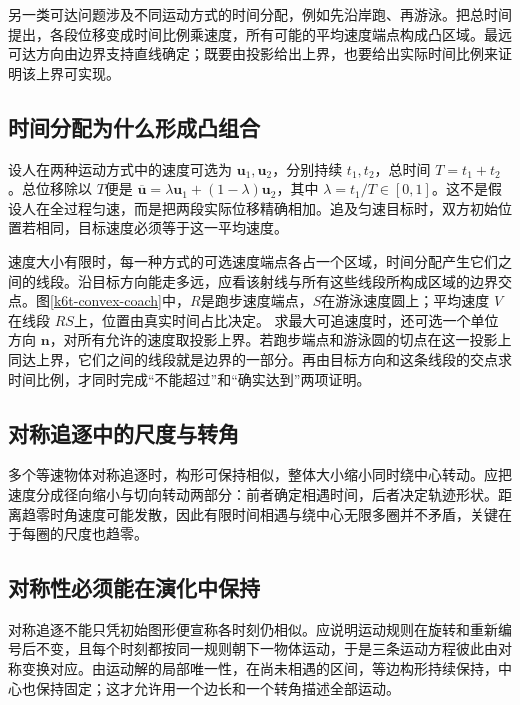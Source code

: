 另一类可达问题涉及不同运动方式的时间分配，例如先沿岸跑、再游泳。把总时间提出，各段位移变成时间比例乘速度，所有可能的平均速度端点构成凸区域。最远可达方向由边界支持直线确定；既要由投影给出上界，也要给出实际时间比例来证明该上界可实现。

\subsection{时间分配为什么形成凸组合}
设人在两种运动方式中的速度可选为 $\bm u_1,\bm u_2$，分别持续 $t_1,t_2$，总时间 $T=t_1+t_2$。总位移除以 $T$便是 $\overline{\bm u}=\lambda\bm u_1+(1-\lambda)\bm u_2$，其中 $\lambda=t_1/T\in[0,1]$。这不是假设人在全过程匀速，而是把两段实际位移精确相加。追及匀速目标时，双方初始位置若相同，目标速度必须等于这一平均速度。

速度大小有限时，每一种方式的可选速度端点各占一个区域，时间分配产生它们之间的线段。沿目标方向能走多远，应看该射线与所有这些线段所构成区域的边界交点。图\ref{k6t-convex-coach}中，$R$是跑步速度端点，$S$在游泳速度圆上；平均速度 $V$在线段 $RS$上，位置由真实时间占比决定。
求最大可追速度时，还可选一个单位方向 $\bm n$，对所有允许的速度取投影上界。若跑步端点和游泳圆的切点在这一投影上同达上界，它们之间的线段就是边界的一部分。再由目标方向和这条线段的交点求时间比例，才同时完成“不能超过”和“确实达到”两项证明。

\subsection{对称追逐中的尺度与转角}
多个等速物体对称追逐时，构形可保持相似，整体大小缩小同时绕中心转动。应把速度分成径向缩小与切向转动两部分：前者确定相遇时间，后者决定轨迹形状。距离趋零时角速度可能发散，因此有限时间相遇与绕中心无限多圈并不矛盾，关键在于每圈的尺度也趋零。
\subsection{对称性必须能在演化中保持}
对称追逐不能只凭初始图形便宣称各时刻仍相似。应说明运动规则在旋转和重新编号后不变，且每个时刻都按同一规则朝下一物体运动，于是三条运动方程彼此由对称变换对应。由运动解的局部唯一性，在尚未相遇的区间，等边构形持续保持，中心也保持固定；这才允许用一个边长和一个转角描述全部运动。

